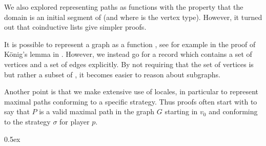 \documentclass[11pt,a4paper]{scrartcl}
\begin{document}
We also explored representing paths as functions  with the property
that the domain is an initial segment of \isa{nat} (and where
 is the vertex type).  However, it turned out
that coinductive lists give simpler proofs.

It is possible to represent a graph as a function
, see for example in the proof of König's
lemma in \cite{Coinductive-AFP}.  However, we instead go for a record
which contains a set of vertices and a set of edges explicitly.  By
not requiring that the set of vertices is  but rather a subset of , it becomes easier to reason about subgraphs.

Another point is that we make extensive use of locales, in particular
to represent maximal paths conforming to a specific strategy.  Thus
proofs often start with  to say that $P$ is a valid maximal path in the graph
$G$ starting in $v_0$ and conforming to the strategy $\sigma$ for
player $p$.

\parindent 0pt\parskip 0.5ex



\clearpage
\phantomsection
{}


\end{document}
